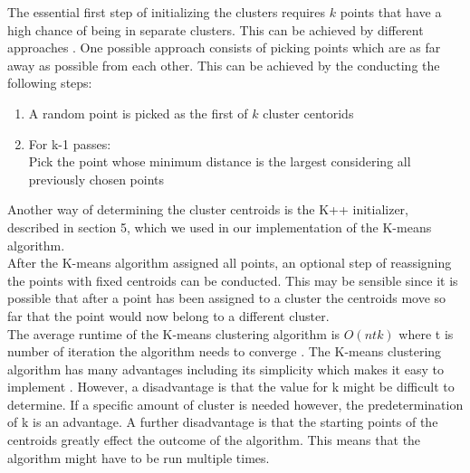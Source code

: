 The essential first step of initializing the clusters requires $k$ points that have a high chance of being in separate clusters. This can be achieved by different approaches . One possible approach consists of picking points which are as far away as possible from each other. This can be achieved by the conducting the following steps: \cite{MMDS}
\begin{enumerate}
	\item	A random point is picked as the first of $k$ cluster centorids
	\item	For k-1 passes: \\
	Pick the point whose minimum distance is the largest considering all previously chosen points
	
\end{enumerate}
Another way of determining the cluster centroids is the K++ initializer, described in section 5, which we used in our implementation of the K-means algorithm.\\
After the K-means algorithm assigned all points, an optional step of reassigning the points with fixed centroids can be conducted. This may be sensible since it is possible that after a point has been assigned to a cluster the centroids move so far that the point would now belong to a different cluster.\\
The average runtime of the K-means clustering algorithm is $O(ntk)$ where t is number of iteration the algorithm needs to converge \cite{scikit-learn-extra}.
The K-means clustering algorithm has many advantages including its simplicity which makes it easy to implement \cite{santini2016advantages}. However, a disadvantage is that the value for k might be difficult to determine. If a specific amount of cluster is needed however, the predetermination of k is an advantage. A further disadvantage is that the starting points of the centroids greatly effect the outcome of the algorithm. This means that the algorithm might have to be run multiple times.
